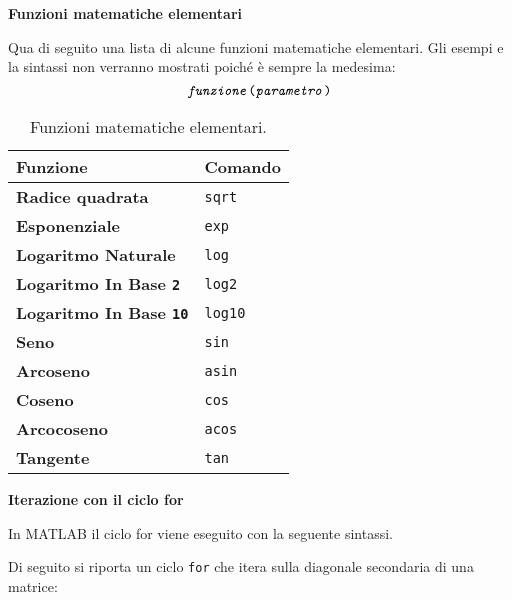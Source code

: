 \begin{flushleft}
    \large
    \hypertarget{
        lab: Funzioni matematiche elementari
    }{
        \textcolor{Red3}{\textbf{Funzioni matematiche elementari}}
    }
    \label{lab: Funzioni matematiche elementari}
\end{flushleft}
Qua di seguito una lista di alcune funzioni matematiche elementari. Gli esempi e la sintassi non verranno mostrati poiché è sempre la medesima:
\begin{equation*}
    \texttt{\emph{funzione}(\emph{parametro})}
\end{equation*}
\begin{table}[!htp]
    \centering
    \begin{tabular}{@{} l l @{}}
        \toprule
        \textbf{Funzione} & \textbf{Comando} \\
        \midrule
        \textbf{Radice quadrata}                & \texttt{sqrt} \\
        \textbf{Esponenziale}                   & \texttt{exp} \\
        \textbf{Logaritmo Naturale}             & \texttt{log} \\
        \textbf{Logaritmo In Base \texttt{2}}   & \texttt{log2} \\
        \textbf{Logaritmo In Base \texttt{10}}  & \texttt{log10} \\
        \textbf{Seno}                           & \texttt{sin} \\
        \textbf{Arcoseno}                       & \texttt{asin} \\
        \textbf{Coseno}                         & \texttt{cos} \\
        \textbf{Arcocoseno}                     & \texttt{acos} \\
        \textbf{Tangente}                       & \texttt{tan} \\
        \bottomrule
    \end{tabular}
    \caption{Funzioni matematiche elementari.}
\end{table}

\longline

\begin{flushleft}
    \large
    \textcolor{Red3}{\textbf{Iterazione con il ciclo for}}
\end{flushleft}
In MATLAB il ciclo for viene eseguito con la seguente sintassi.

Di seguito si riporta un ciclo \texttt{for} che itera sulla diagonale secondaria di una matrice:


